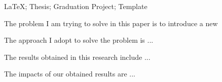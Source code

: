 \makecover

\begin{abstract}{\LaTeX; 论文; 毕业设计; 模板}

大数据时代背景下，拥有客户多方面数据的保险公司迎来了机遇与挑战。通过运用数据科学的分析方法，
可以挖掘潜藏在数据中的信息，并对信息进行加工利用, 从而辅助优化保险产品的定价和理赔额的设计，
并且可能产出更好的产品或提供更好的服务。

本文将根据数据科学的研究范式，即通过数据清洗到模型检验的一系列步骤，
对几个保险公司相关的数据集进行探索和研究，并将结果与通过传统统计方法
所得到的结果进行比较。


\end{abstract}


\begin{abstractEng}{\LaTeX; Thesis; Graduation Project; Template}

The problem I am trying to solve in this paper is to introduce a new  

The approach I adopt to solve the problem is ...

The results obtained in this research include ...

The impacts of our obtained results are ...

\end{abstractEng}


\tableofcontents